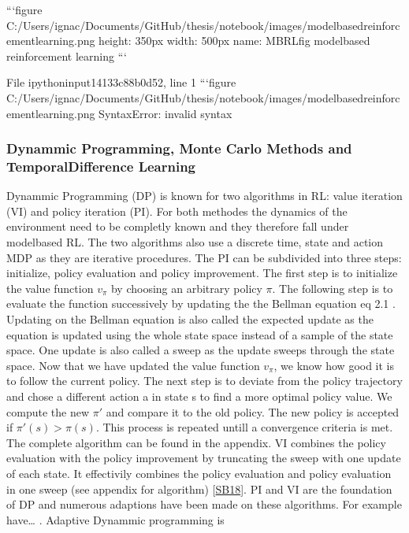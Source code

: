 \documentclass[letterpaper,10pt,english]{jupyterBook}
\begin{document}
\begin{sphinxVerbatim}[commandchars=\\\{\}]

```\PYGZob{}figure\PYGZcb{} C:/Users/ignac/Documents/GitHub/thesis/notebook/images/model\PYGZus{}based\PYGZus{}reinforcement\PYGZus{}learning.png
\PYGZhy{}\PYGZhy{}\PYGZhy{}
height: 350px
width: 500px
name: MB\PYGZus{}RL\PYGZhy{}fig
\PYGZhy{}\PYGZhy{}\PYGZhy{}
model\PYGZus{}based reinforcement learning  
```
\end{sphinxVerbatim}

\begin{sphinxVerbatim}[commandchars=\\\{\}]
  File \PYGZdq{}\PYGZlt{}ipython\PYGZhy{}input\PYGZhy{}1\PYGZhy{}4133c88b0d52\PYGZgt{}\PYGZdq{}, line 1
    ```\PYGZob{}figure\PYGZcb{} C:/Users/ignac/Documents/GitHub/thesis/notebook/images/model\PYGZus{}based\PYGZus{}reinforcement\PYGZus{}learning.png
    \PYGZca{}
SyntaxError: invalid syntax
\end{sphinxVerbatim}


\subsubsection{Dynammic Programming, Monte Carlo Methods and Temporal\sphinxhyphen{}Difference Learning}
\label{\detokenize{Reinforcement_learning:dynammic-programming-monte-carlo-methods-and-temporal-difference-learning}}
\sphinxAtStartPar
Dynammic Programming (DP) is known for two algorithms in RL: value iteration (VI) and policy iteration (PI). For both methodes the dynamics of the environment need to be completly known and they therefore fall under model\sphinxhyphen{}based RL. The two algorithms also use a discrete time, state and action MDP as they are iterative procedures. The PI can be subdivided into three steps: initialize, policy evaluation and policy improvement. The first step is to initialize the value function \(v_{\pi}\) by choosing an arbitrary policy \(\pi\). The following step is to evaluate the function successively by updating the the Bellman equation eq 2.1 . Updating on the Bellman equation is also called the expected update as the equation is updated using the whole state space instead of a sample of the state space. One update is also called a sweep as the update sweeps through the state space. Now that we have updated the value function \(v_{\pi}\), we know how good it is to follow the current policy. The next step is to deviate from the policy trajectory and chose a different action a in state s to find a more optimal policy value. We compute the new \(\pi '\) and compare it to the old policy. The new policy is accepted if \(\pi '(s) > \pi(s)\). This process is repeated untill a convergence criteria is met. The complete algorithm can be found in the appendix. VI combines the policy evaluation with the policy improvement by truncating the sweep with one update of each state. It effectivily combines the policy evaluation and policy evaluation in one sweep (see appendix for algorithm) {[}\hyperlink{cite.Financial_application:id70}{SB18}{]}. PI and VI are the foundation of DP and numerous adaptions have been made on these algorithms. For example have… . Adaptive Dynammic programming is
\end{document}
